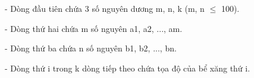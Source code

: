 - Dòng đầu tiên chứa 3 số nguyên dương m, n, k (m, n  $\le$  100).   


   - Dòng thứ hai chứa m số nguyên a1, a2, ..., am.   


   - Dòng thứ ba chứa n số nguyên b1, b2, ..., bn.   


   - Dòng thứ i trong k dòng tiếp theo chứa tọa độ của bể xăng thứ i.